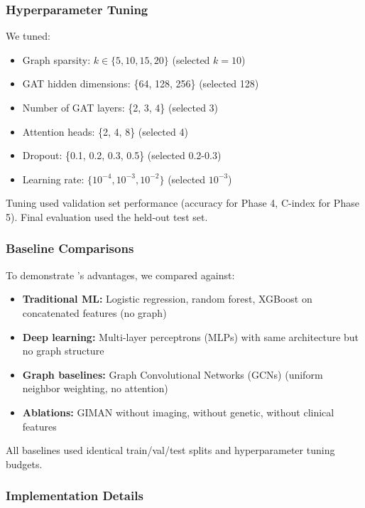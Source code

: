 \subsubsection{Hyperparameter Tuning}

We tuned:
\begin{itemize}
    \item Graph sparsity: $k \in \{5, 10, 15, 20\}$ (selected $k=10$)
    \item GAT hidden dimensions: \{64, 128, 256\} (selected 128)
    \item Number of GAT layers: \{2, 3, 4\} (selected 3)
    \item Attention heads: \{2, 4, 8\} (selected 4)
    \item Dropout: \{0.1, 0.2, 0.3, 0.5\} (selected 0.2-0.3)
    \item Learning rate: $\{10^{-4}, 10^{-3}, 10^{-2}\}$ (selected $10^{-3}$)
\end{itemize}

Tuning used validation set performance (accuracy for Phase 4, C-index for Phase 5). Final evaluation used the held-out test set.

\subsubsection{Baseline Comparisons}

To demonstrate \giman's advantages, we compared against:

\begin{itemize}
    \item \textbf{Traditional ML:} Logistic regression, random forest, XGBoost on concatenated features (no graph)
    \item \textbf{Deep learning:} Multi-layer perceptrons (MLPs) with same architecture but no graph structure
    \item \textbf{Graph baselines:} Graph Convolutional Networks (GCNs)\cite{kipf2017semi} (uniform neighbor weighting, no attention)
    \item \textbf{Ablations:} GIMAN without imaging, without genetic, without clinical features
\end{itemize}

All baselines used identical train/val/test splits and hyperparameter tuning budgets.

\subsubsection{Implementation Details}


